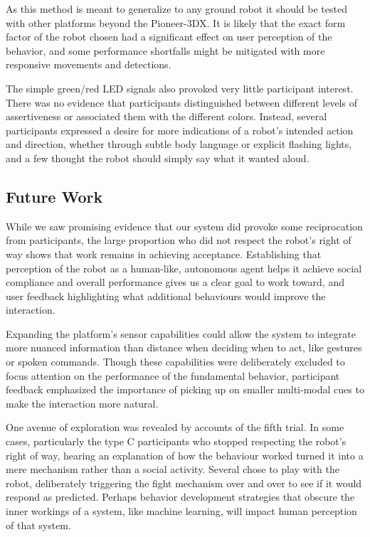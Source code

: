 \documentclass[letterpaper, 10 pt, conference]{ieeeconf}  %
\begin{document}
As this method is meant to generalize to any ground robot it should be tested with other platforms beyond the Pioneer-3DX. It is likely that the exact form factor of the robot chosen had a significant effect on user perception of the behavior, and some performance shortfalls might be mitigated with more responsive movements and detections. 

The simple green/red LED signals also provoked very little participant interest. There was no evidence that participants distinguished between different levels of assertiveness or associated them with the different colors. Instead, several participants expressed a desire for more indications of a robot’s intended action and direction, whether through subtle body language or explicit flashing lights, and a few thought the robot should simply say what it wanted aloud. 

\subsection{Future Work}

While we saw promising evidence that our system did provoke some reciprocation from participants, the large proportion who did not respect the robot's right of way shows that work remains in achieving acceptance.  Establishing that perception of the robot as a human-like, autonomous agent helps it achieve social compliance and overall performance gives us a clear goal to work toward, and user feedback highlighting what additional behaviours would improve the interaction.

Expanding the platform’s sensor capabilities could allow the system to integrate more nuanced information than distance when deciding when to act, like gestures or spoken commands. Though these capabilities were deliberately excluded to focus attention on the performance of the fundamental behavior, participant feedback emphasized the importance of picking up on smaller multi-modal cues to make the interaction more natural.

One avenue of exploration was revealed by accounts of the fifth trial. In some cases, particularly the type C participants who stopped respecting the robot's right of way, hearing an explanation of how the behaviour worked turned it into a mere mechanism rather than a social activity. Several chose to play with the robot, deliberately triggering the fight mechanism over and over to see if it would respond as predicted. Perhaps behavior development strategies that obscure the inner workings of a system, like machine learning, will impact human perception of that system.
\end{document}
